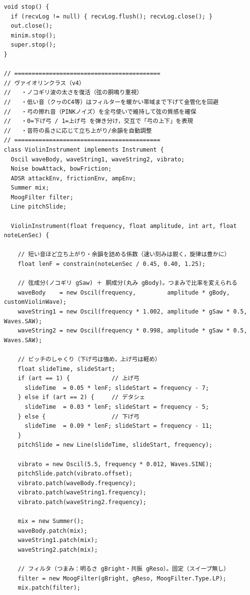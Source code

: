 \begin{lstlisting}
void stop() {
  if (recvLog != null) { recvLog.flush(); recvLog.close(); }
  out.close();
  minim.stop();
  super.stop();
}

// ==========================================
// ヴァイオリンクラス（v4）
//   ・ノコギリ波の太さを復活（弦の胴鳴り重視）
//   ・低い音（クヮのC4等）はフィルターを暖かい帯域まで下げて金管化を回避
//   ・弓の擦れ音（PINKノイズ）を全弓使いで維持して弦の質感を確保
//   ・0=下げ弓 / 1=上げ弓 を弾き分け，交互で「弓の上下」を表現
//   ・音符の長さに応じて立ち上がり/余韻を自動調整
// ==========================================
class ViolinInstrument implements Instrument {
  Oscil waveBody, waveString1, waveString2, vibrato;
  Noise bowAttack, bowFriction;
  ADSR attackEnv, frictionEnv, ampEnv;
  Summer mix;
  MoogFilter filter;
  Line pitchSlide;

  ViolinInstrument(float frequency, float amplitude, int art, float noteLenSec) {

    // 短い音ほど立ち上がり・余韻を詰める係数（速い刻みは鋭く，旋律は豊かに）
    float lenF = constrain(noteLenSec / 0.45, 0.40, 1.25);

    // 弦成分(ノコギリ gSaw) ＋ 胴成分(丸み gBody)。つまみで比率を変えられる
    waveBody    = new Oscil(frequency,         amplitude * gBody,      customViolinWave);
    waveString1 = new Oscil(frequency * 1.002, amplitude * gSaw * 0.5, Waves.SAW);
    waveString2 = new Oscil(frequency * 0.998, amplitude * gSaw * 0.5, Waves.SAW);

    // ピッチのしゃくり（下げ弓は強め，上げ弓は軽め）
    float slideTime, slideStart;
    if (art == 1) {            // 上げ弓
      slideTime  = 0.05 * lenF; slideStart = frequency - 7;
    } else if (art == 2) {     // デタシェ
      slideTime  = 0.03 * lenF; slideStart = frequency - 5;
    } else {                   // 下げ弓
      slideTime  = 0.09 * lenF; slideStart = frequency - 11;
    }
    pitchSlide = new Line(slideTime, slideStart, frequency);

    vibrato = new Oscil(5.5, frequency * 0.012, Waves.SINE);
    pitchSlide.patch(vibrato.offset);
    vibrato.patch(waveBody.frequency);
    vibrato.patch(waveString1.frequency);
    vibrato.patch(waveString2.frequency);

    mix = new Summer();
    waveBody.patch(mix);
    waveString1.patch(mix);
    waveString2.patch(mix);

    // フィルタ（つまみ：明るさ gBright・共振 gReso）。固定（スイープ無し）
    filter = new MoogFilter(gBright, gReso, MoogFilter.Type.LP);
    mix.patch(filter);


\end{lstlisting}
